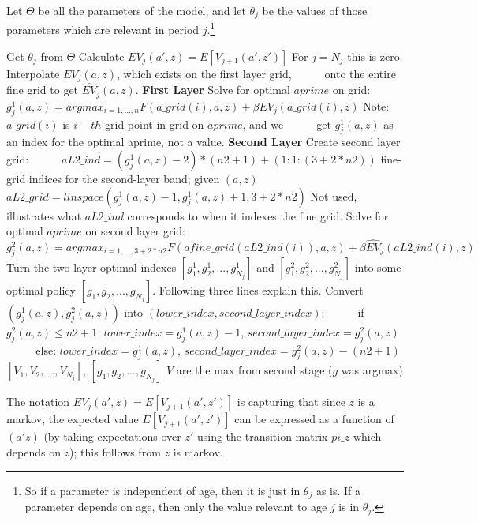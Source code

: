 \documentclass[11pt,fleqn]{article}
\begin{document}
Let $\Theta$ be all the parameters of the model, and let $\theta_j$ be the values of those parameters which are relevant in period $j$.\footnote{So if a parameter is independent of age, then it is just in $\theta_j$ as is. If a parameter depends on age, then only the value relevant to age $j$ is in $\theta_j$.}
\begin{algorithmic}
   \State Get $\theta_j$ from $\Theta$
    \State Calculate $EV_j(a',z)=E[V_{j+1}(a',z')]$ \Comment For $j=N_j$ this is zero
    \State Interpolate $EV_j(a,z)$, which exists on the first layer grid,
    \State $\quad$ $\quad$ onto the entire fine grid to get $\hat{EV}_j(a,z)$.
     \State \textbf{First Layer}
     \State Solve for optimal $aprime$ on grid:
     \State $\quad$ $\quad$ $g^1_{j}(a,z)=argmax_{i=1,...,n} F(a\_{}grid(i),a,z) + \beta EV_j(a\_{}grid(i),z)$
     \State Note: $a\_{}grid(i)$ is $i-th$ grid point in grid on $aprime$, and we
     \State $\quad$ $\quad$ get $g^1_{j}(a,z)$ as an index for the optimal aprime, not a value.
     \State \textbf{Second Layer}
     \State Create second layer grid:
     \State $\quad$ $\quad$ $aL2\_{}ind=(g^1_j(a,z)-2)*(n2+1)+(1:1:(3+2*n2))$  \Comment fine-grid indices for the second-layer band; given $(a,z)$
     \State $\quad$ $\quad$ $aL2\_{}grid=linspace(g^1_j(a,z)-1,g^1_j(a,z)+1,3+2*n2)$  \Comment Not used, illustrates what $aL2\_{}ind$ corresponds to when it indexes the fine grid.
     \State Solve for optimal $aprime$ on second layer grid:
     \State $\quad$ $\quad$ $g^2_{j}(a,z)=argmax_{i=1,...,3+2*n2} F(afine\_{}grid(aL2\_{}ind(i)),a,z) + \beta \hat{EV}_j(aL2\_{}ind(i),z)$
    \EndFor
   \EndFor
  \EndFor
  \State Turn the two layer optimal indexes $[g^1_1,g^1_2,...,g^1_{N_j}]$ and  $[g^2_1,g^2_2,...,g^2_{N_j}]$ into some optimal policy $[g_1,g_2,...,g_{N_j}]$. \Comment Following three lines explain this.
  \State Convert $(g^1_j(a,z), g^2_j(a,z))$ into $(lower\_{}index, second\_{}layer\_{}index)$:
  \State $\quad$ $\quad$ if $g^2_j(a,z) \leq n2+1$: $lower\_{}index=g^1_j(a,z)-1$, $second\_{}layer\_{}index=g^2_j(a,z)$
  \State $\quad$ $\quad$ else: $lower\_{}index=g^1_j(a,z)$, $second\_{}layer\_{}index=g^2_j(a,z)-(n2+1)$
  \\ \Return $[V_1,V_2,...,V_{N_j}]$, $[g_1,g_2,...,g_{N_j}]$ \Comment $V$ are the max from second stage ($g$ was argmax)
\end{algorithmic}
The notation $EV_j(a',z)=E[V_{j+1}(a',z')]$ is capturing that since $z$ is a markov, the expected value $E[V_{j+1}(a',z')]$ can be expressed as a function of $(a'z)$ (by taking expectations over $z'$ using the transition matrix $pi\_{}z$ which depends on $z$); this follows from $z$ is markov.
\end{document}
